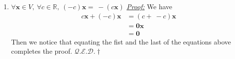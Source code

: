 \documentclass[oneside, 12pt]{book}
\newcommand{\qed}{\hfill $\mathcal{Q}.\mathcal{E}.\mathcal{D}.\dagger$}
\newcommand{\tit}[1]{\textit{#1}}
\newcommand{\proof}{\tit{\underline{Proof:}}} %
\newcommand{\vx}{\mathbf{x}}
\begin{document}
\begin{enumerate}
\begin{enumerate}
        \item $\forall \mathbf{x} \in V,~\forall c\in \mathbb{R}, ~(-c)\mathbf{x}=~-(c\mathbf{x})$ \newline
        \proof \newline
        We have
        \begin{align*}
            c\vx + (-c)\vx &= (c +~-c)\vx \\
            &= \mathbf{0}\vx \\
            &= \mathbf{0}
        \end{align*}
        Then we notice that equating the fist and the last of the equations above completes the proof. \qed
        
    \end{enumerate}
\end{enumerate}
\end{document}
